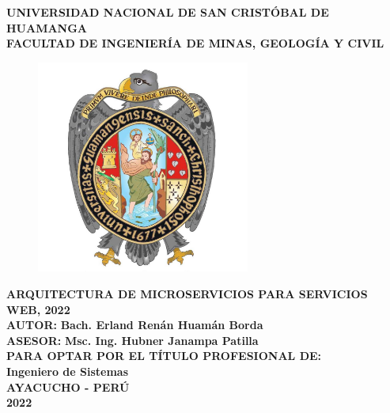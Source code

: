\begin{titlepage}

\centering
  { \fontsize{18pt}{\baselineskip}\selectfont \textbf{UNIVERSIDAD NACIONAL DE SAN CRISTÓBAL DE HUAMANGA} }\\[0.25cm]
  { \fontsize{16pt}{\baselineskip}\selectfont \textbf{FACULTAD DE INGENIERÍA DE MINAS, GEOLOGÍA Y CIVIL} }\\[0.55cm]

  \begin{figure}[htb]
    \centering
    \includegraphics[height=7cm]{src/assets/unsch_logo.jpg}
  \end{figure}

\vspace{0.5cm}
{\fontsize{14pt}{ \baselineskip}\selectfont \textbf{
  ARQUITECTURA DE MICROSERVICIOS PARA SERVICIOS WEB, 2022
}}\\[0.5cm]
{\fontsize{14pt}{ \baselineskip}\selectfont \textbf{AUTOR:}}
{\fontsize{14pt}{ \baselineskip}\selectfont \textbf{Bach. Erland Renán Huamán Borda}}\\[0.8cm]
{\fontsize{14pt}{ \baselineskip}\selectfont \textbf{ASESOR:}}
{\fontsize{14pt}{ \baselineskip}\selectfont \textbf{Msc. Ing. Hubner Janampa Patilla}}\\[0.8cm]
{\fontsize{14pt}{ \baselineskip}\selectfont \textbf{PARA OPTAR POR EL TÍTULO PROFESIONAL DE:}}\\[0.8cm]
{\fontsize{14pt}{ \baselineskip}\selectfont \textbf{Ingeniero de Sistemas}}\\[0.5cm]

\vfill
{\fontsize{14pt}{ \baselineskip}\selectfont \textbf{AYACUCHO - PERÚ}}\\[0.5cm]
{\fontsize{14pt}{ \baselineskip}\selectfont \textbf{2022}}
\singlespacing

\end{titlepage}
\restoregeometry
